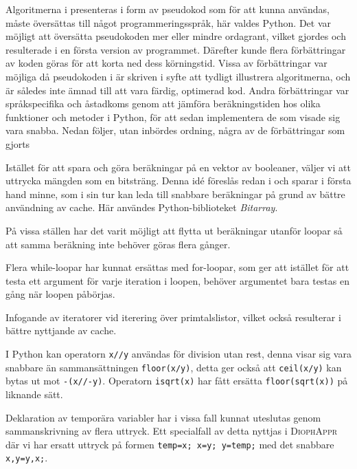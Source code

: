 
Algoritmerna i \cite{HaraldSieve} presenteras i form av pseudokod som för att kunna användas, måste översättas till något programmeringsspråk, här valdes Python.
Det var möjligt att översätta pseudokoden mer eller mindre ordagrant, vilket gjordes och resulterade i en första version av programmet.
Därefter kunde flera förbättringar av koden göras för att korta ned dess körningstid. 
Vissa av förbättringar var möjliga då pseudokoden i \cite{HaraldSieve} är skriven i syfte att tydligt illustrera algoritmerna,
och är således inte ämnad till att vara färdig, optimerad kod.
Andra förbättringar var språkspecifika och åstadkoms genom att jämföra beräkningstiden hos olika funktioner och metoder i Python, för att sedan implementera de som visade sig vara snabba. Nedan följer, utan inbördes ordning, några av de förbättringar som gjorts
\begin{myitemize}
    \item
    Istället för att spara och göra beräkningar på en vektor av booleaner, väljer vi att uttrycka mängden som en bitsträng. 
    Denna idé föreslås redan i \cite{HaraldSieve} och sparar i första hand minne,
    som i sin tur kan leda till snabbare beräkningar på grund av bättre användning av cache.
    Här användes Python-biblioteket \textit{Bitarray}.
    \item
    På vissa ställen har det varit möjligt att flytta ut beräkningar utanför loopar så att samma beräkning inte behöver göras flera gånger.
    \item Flera while-loopar har kunnat ersättas med for-loopar,
    som ger att istället för att testa ett argument för varje iteration i loopen,
    behöver argumentet bara testas en gång när loopen påbörjas.
    \item Infogande av iteratorer vid iterering över primtalslistor, vilket också resulterar i bättre nyttjande av cache.
    \item
    I Python kan operatorn \texttt{x//y} användas för division utan rest, denna visar sig vara snabbare än sammansättningen \texttt{floor(x/y)},
    detta ger också att \texttt{ceil(x/y)} kan bytas ut mot \texttt{-(x//-y)}. Operatorn \texttt{isqrt(x)} har fått ersätta \texttt{floor(sqrt(x))} på liknande sätt.
    \item
    Deklaration av temporära variabler har i vissa fall kunnat uteslutas genom sammanskrivning av flera uttryck. 
    Ett specialfall av detta nyttjas i \textsc{DiophAppr} där vi har ersatt uttryck på formen \texttt{temp=x; x=y; y=temp;} med det snabbare \texttt{x,y=y,x;}.
\end{myitemize}
